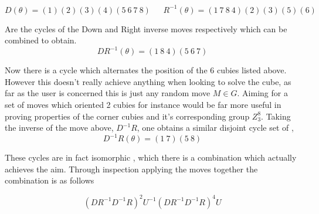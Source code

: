 \documentclass{article}
\begin{document}
\begin{figure}[h]
\centering
\begin{minipage}{3cm}%
%
\end{minipage}%
\end{figure}




\newpage
\begin{equation}
D(\theta)= (1)(2)(3)(4)(5\ 6\ 7\ 8) \ \ \ \ \ \ \ R^{-1}(\theta)= (1\ 7\ 8\ 4)(2)(3)(5)(6)
\end{equation}

Are the cycles of the Down and Right inverse moves respectively which can be combined to obtain. 
\begin{equation}
DR^{-1}(\theta) = (1\ 8\ 4)(5\ 6\ 7)
\end{equation}

Now there is a cycle which alternates the position of the 6 cubies listed above. However this doesn't really achieve anything when looking to solve the cube, as far as the user is concerned this is just any random move $M \in G$. Aiming for a set of moves which oriented 2 cubies for instance would be far more useful in proving properties of the corner cubies and it's corresponding group $Z_{3}^{8}$. Taking the inverse of the move above, $D^{-1}R$, one obtains a similar disjoint cycle set of , 
\begin{equation}
D^{-1}R(\theta) = (1\ 7)(5\ 8)
\end{equation}


These cycles are in fact isomorphic , which there is a combination which actually achieves the aim. Through inspection applying the moves together the combination is as follows

\begin{equation}\label{orientcorner}
(DR^{-1}D^{-1}R)^{2}  U^{-1}  (DR^{-1}D^{-1}R)^{4} U
\end{equation}
\begin{figure}[h]
\centering
  \RubikCubeSolved%
  \hspace{.4cm}
\end{figure}
\end{document}
